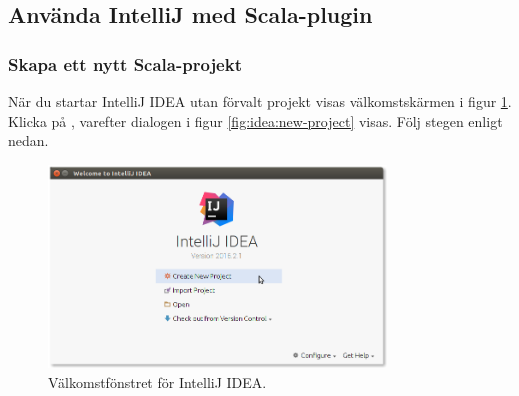 \subsection{Använda IntelliJ med Scala-plugin}%

\subsubsection{Skapa ett nytt Scala-projekt}

När du startar IntelliJ IDEA utan förvalt projekt visas välkomstskärmen i figur \ref{fig:idea:welcome}. Klicka på , varefter dialogen i figur \ref{fig:idea:new-project} visas. Följ stegen enligt nedan.

\begin{figure}[H]
\centering
\includegraphics[width=0.8\textwidth]{../img/intellij/idea-welcome.png}
\caption{Välkomstfönstret för IntelliJ IDEA.}
\label{fig:idea:welcome}
\end{figure}

